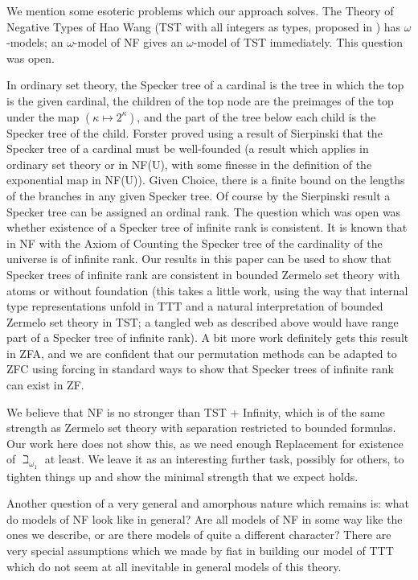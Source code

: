 \documentclass[112pt]{article}
\begin{document}
We mention some esoteric problems which our approach solves.  The Theory of Negative Types of Hao Wang (TST with all integers as types, proposed in \cite{tnt})  has $\omega$-models;  an $\omega$-model of NF gives an $\omega$-model of TST immediately.  This question was open.

In ordinary set theory, the Specker tree of a cardinal is the tree in which the top is the given cardinal, the children of the top node  are the preimages of the top under the map $(\kappa \mapsto 2^{\kappa})$, and the part of the tree
below each child is the Specker tree of the child.  Forster proved using a result of Sierpinski that the Specker tree of a cardinal must be well-founded (a result which applies in ordinary set theory or in NF(U), with some finesse in the definition of the exponential map in NF(U)).  Given Choice, there is a finite bound on the lengths of the branches in any given Specker tree.  Of course by the Sierpinski result a Specker tree can be assigned an ordinal rank.  The question which was open
was whether existence of a Specker tree of infinite rank is consistent.  It is known that in NF with the Axiom of Counting the Specker tree of the cardinality of the universe is of infinite rank.  Our results in this paper can be used to show that Specker trees of infinite rank are consistent in bounded Zermelo set theory with atoms or without foundation (this takes a little work, using the way that internal type representations unfold in TTT and a natural interpretation of bounded Zermelo set theory in TST;  a tangled web as described above would have range part of a Specker tree of infinite rank).  A bit more work definitely gets this result in ZFA, and we are confident that our permutation methods can be adapted to ZFC using forcing in standard ways to show that Specker trees of infinite rank can exist in ZF.

We believe that NF is no stronger than TST + Infinity, which is of the same strength as Zermelo set theory with separation restricted to bounded formulas.  Our work here does not show this, as we need enough Replacement for
existence of $\beth_{\omega_1}$ at least.  We leave it as an interesting further task, possibly for others, to tighten things up and show the minimal strength that we expect holds.

Another question of a very general and amorphous nature which remains is:  what do models of NF look like in general?  Are all models of NF in some way like the ones we describe, or are there models of quite a different character?  There are very special assumptions which we made by fiat in building our model of TTT which do  not seem at all inevitable in general models of this theory.
\end{document}
